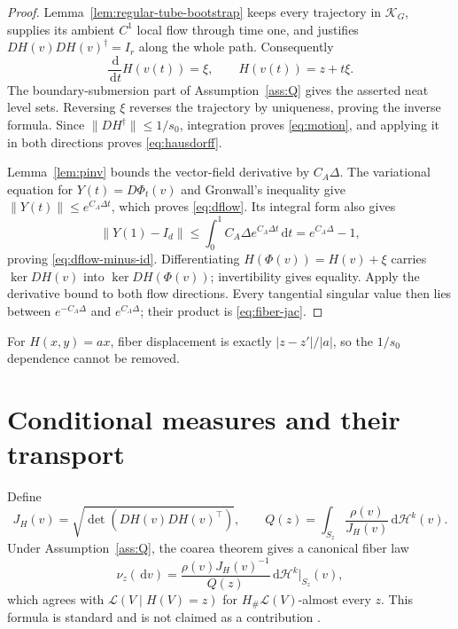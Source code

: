 \documentclass[11pt]{article}
\theoremstyle{definition}
\newcommand{\dd}{\,\mathrm d}
\begin{document}
\begin{proof}
Lemma~\ref{lem:regular-tube-bootstrap} keeps every trajectory in
$\mathcal K_G$, supplies its ambient $C^1$ local flow through time one, and
justifies $DH(v)DH(v)^\dagger=I_r$ along the whole path.  Consequently
\[
 \frac{\dd}{\dd t}H(v(t))=\xi,
 \qquad H(v(t))=z+t\xi.
\]
The boundary-submersion part of Assumption~\ref{ass:Q} gives the asserted neat
level sets.  Reversing $\xi$ reverses the trajectory by uniqueness, proving
the inverse formula.  Since $\|DH^\dagger\|\le1/s_0$, integration proves
\eqref{eq:motion}, and applying it in both
directions proves \eqref{eq:hausdorff}.

Lemma~\ref{lem:pinv} bounds the vector-field derivative by $C_A\Delta$.
The variational equation for $Y(t)=D\Phi_t(v)$ and Gronwall's inequality give
$\|Y(t)\|\le e^{C_A\Delta t}$, which proves \eqref{eq:dflow}.  Its integral
form also gives
\[
 \|Y(1)-I_d\|
 \le\int_0^1C_A\Delta e^{C_A\Delta t}\dd t
 =e^{C_A\Delta}-1,
\]
proving \eqref{eq:dflow-minus-id}.
Differentiating $H(\Phi(v))=H(v)+\xi$ carries $\ker DH(v)$ into
$\ker DH(\Phi(v))$; invertibility gives equality.  Apply the derivative bound
to both flow directions.  Every tangential singular value then lies between
$e^{-C_A\Delta}$ and $e^{C_A\Delta}$; their product is
\eqref{eq:fiber-jac}.
\end{proof}

For $H(x,y)=ax$, fiber displacement is exactly $|z-z'|/|a|$, so the
$1/s_0$ dependence cannot be removed.

\section{Conditional measures and their transport}

Define
\[
 J_H(v)=\sqrt{\det(DH(v)DH(v)^\top)},\qquad
 Q(z)=\int_{S_z}\frac{\rho(v)}{J_H(v)}\dd\mathcal H^k(v).
\]
Under Assumption~\ref{ass:Q}, the coarea theorem gives a canonical fiber law
\begin{equation}\label{eq:coarea}
 \nu_z(\dd v)=\frac{\rho(v)J_H(v)^{-1}}{Q(z)}
 \dd\mathcal H^k|_{S_z}(v),
\end{equation}
which agrees with $\mathcal L(V\mid H(V)=z)$ for
$H_\#\mathcal L(V)$-almost every $z$.  This formula is standard and is not
claimed as a contribution \citep{akhyar2025levelsets}.
\end{document}
